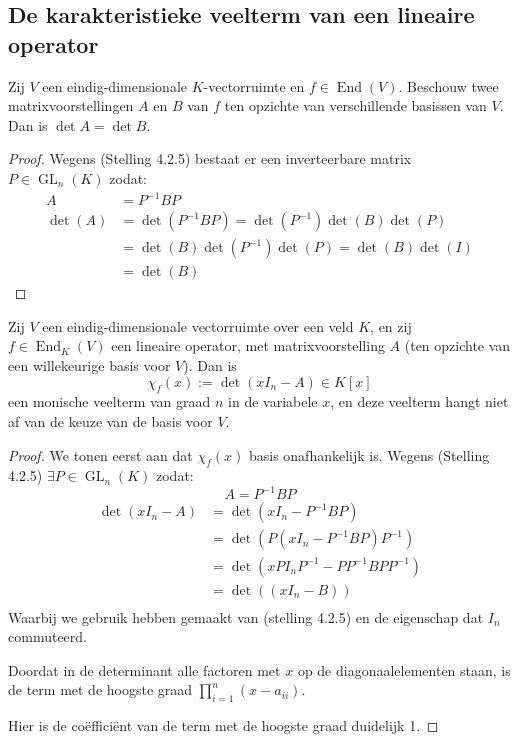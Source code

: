 \subsection{De karakteristieke veelterm van een lineaire operator}

\begin{lemma}[6.1.1]
    Zij $V$ een eindig-dimensionale $K$-vectorruimte en $f \in \operatorname{End}(V)$. Beschouw twee matrixvoorstellingen $A$ en $B$ van $f$ ten opzichte van verschillende basissen van $V$. Dan is $\det A = \det B$.
\end{lemma}
\begin{proof}
    Wegens (Stelling 4.2.5) bestaat er een inverteerbare matrix $P \in \operatorname{GL}_n(K)$ zodat:
    \begin{align*}
        A &= P^{-1}BP\\
        \det(A) &= \det(P^{-1}BP) = \det(P^{-1})\det(B)\det(P)\\
        &= \det(B)\det(P^{-1})\det(P) = \det(B)\det(I)\\
        &= \det(B)
    \end{align*}
\end{proof}

\begin{lemma}[6.1.4]
    Zij $V$ een eindig-dimensionale vectorruimte over een veld $K$, en zij $f \in \operatorname{End}_K(V)$ een lineaire operator, met matrixvoorstelling $A$ (ten opzichte van een willekeurige basis voor $V$). Dan is
    \[ \chi_f(x) := \det(xI_n - A) \in K[x] \]
    een monische veelterm van graad $n$ in de variabele $x$, en deze veelterm hangt niet af van de keuze van de basis voor $V$.
\end{lemma}
\begin{proof}
    We tonen eerst aan dat \(\chi_f(x)\) basis onafhankelijk is.
    Wegens (Stelling 4.2.5)  $\exists P \in \operatorname{GL}_n(K)$ zodat:
    \[A = P^{-1}BP\]
    \begin{align*}
        \det(xI_n - A)
        &= \det(xI_n - P^{-1}BP)\\
         &= \det(P(xI_n - P^{-1}BP)P^{-1})\\
         &= \det(xPI_nP^{-1} - PP^{-1}BPP^{-1})\\
         &= \det((xI_n - B)) \\
    \end{align*}
    Waarbij we gebruik hebben gemaakt van (stelling 4.2.5) en de eigenschap dat \(I_n\) commuteerd.

    Doordat in de determinant alle factoren met \(x\) op de diagonaalelementen staan,
    is de term met de hoogste graad \(\prod_{i = 1}^n (x - a_{ii})\).

    Hier is de coëfficiënt van de term met de hoogste graad duidelijk 1.
\end{proof}

